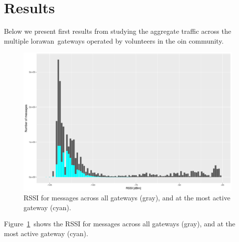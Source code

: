 \section{Results}\label{sec:results}

Below we present first results from studying the aggregate
traffic across the multiple \gls{lorawan} gateways operated
by volunteers in the \gls{oin} community.


\begin{figure}
  \centering
  \includegraphics[width=\columnwidth]{figures/rssi.pdf}
  \caption{\acrshort{RSSI} for messages across all gateways (gray), and at the most active gateway (cyan).}
  \label{fig:rssi}
\end{figure}

Figure~\ref{fig:rssi} shows the \gls{RSSI} for messages across all
gateways (gray), and at the most active gateway (cyan).




